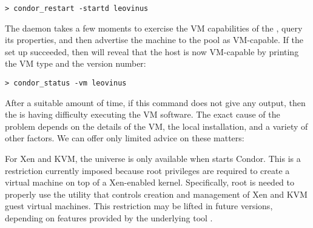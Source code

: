 \begin{verbatim}
> condor_restart -startd leovinus
\end{verbatim}

The  daemon takes a few moments to exercise the VM
capabilities of the , query its properties, and then 
advertise the machine to the pool as VM-capable.
If the set up succeeded,
 then  will reveal that the host is now 
VM-capable by printing the VM type and the version number:

\begin{verbatim}
> condor_status -vm leovinus
\end{verbatim}

After a suitable amount of time, if this command does not give any output,
then the  is having difficulty executing the VM software.
The exact cause of the problem depends on the details of the VM, the local 
installation, and a variety of other factors. We can offer only limited 
advice on these matters:

For Xen and KVM,
the  universe is only available when  starts Condor.
This is a restriction currently imposed because root privileges are 
required to create a virtual machine on top of a Xen-enabled kernel.
Specifically, root is needed 
to properly use the  utility that controls 
creation and management of Xen and KVM guest virtual machines.
This restriction may be lifted in future versions,
depending on features provided by the underlying tool .
